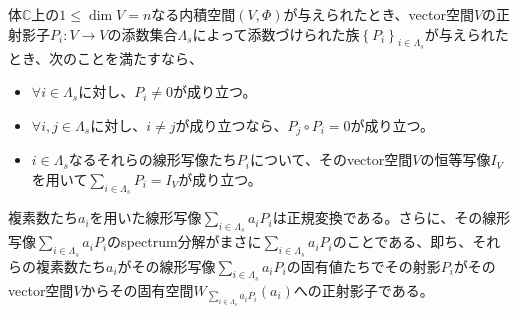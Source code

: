 \documentclass[dvipdfmx]{jsarticle}
\begin{document}
\begin{thm}\label{2.3.9.12}
体$\mathbb{C}$上の$1 \leq \dim V = n$なる内積空間$(V,\varPhi)$が与えられたとき、vector空間$V$の正射影子$P_{i}:V \rightarrow V$の添数集合$\varLambda_{s}$によって添数づけられた族$\left\{ P_{i} \right\}_{i \in \varLambda_{s}}$が与えられたとき、次のことを満たすなら、
\begin{itemize}
\item
  $\forall i \in \varLambda_{s}$に対し、$P_{i} \neq 0$が成り立つ。
\item
  $\forall i,j \in \varLambda_{s}$に対し、$i \neq j$が成り立つなら、$P_{j} \circ P_{i} = 0$が成り立つ。
\item
  $i \in \varLambda_{s}$なるそれらの線形写像たち$P_{i}$について、そのvector空間$V$の恒等写像$I_{V}$を用いて$\sum_{i \in \varLambda_{s}} P_{i} = I_{V}$が成り立つ。
\end{itemize}
複素数たち$a_{i}$を用いた線形写像$\sum_{i \in \varLambda_{s}} {a_{i}P_{i}}$は正規変換である。さらに、その線形写像$\sum_{i \in \varLambda_{s}} {a_{i}P_{i}}$のspectrum分解がまさに$\sum_{i \in \varLambda_{s}} {a_{i}P_{i}}$のことである、即ち、それらの複素数たち$a_{i}$がその線形写像$\sum_{i \in \varLambda_{s}} {a_{i}P_{i}}$の固有値たちでその射影$P_{i}$がそのvector空間$V$からその固有空間$W_{\sum_{i \in \varLambda_{s}} {a_{i}P_{i}}}\left( a_{i} \right)$への正射影子である。
\end{thm}
\end{document}
